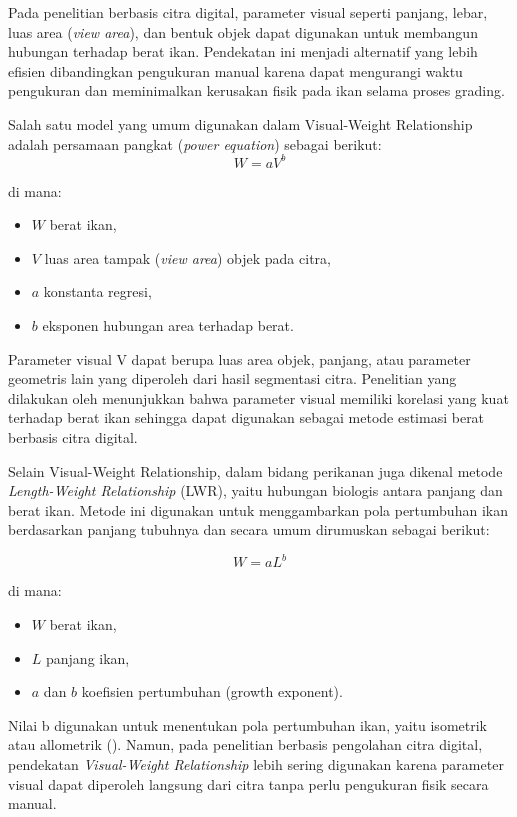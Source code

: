Pada penelitian berbasis citra digital, parameter visual seperti panjang, lebar, luas area (\emph{view area}), dan bentuk objek dapat digunakan untuk membangun hubungan terhadap berat ikan.
Pendekatan ini menjadi alternatif yang lebih efisien dibandingkan pengukuran manual karena dapat mengurangi waktu pengukuran dan meminimalkan kerusakan fisik pada ikan selama proses grading.

Salah satu model yang umum digunakan dalam Visual-Weight Relationship adalah persamaan pangkat (\emph{power equation}) sebagai berikut:
\begin{equation}
W = aV^b
\label{eq:vwr}
\end{equation}

di mana:
\begin{itemize}
    \item $W$ berat ikan,
    \item $V$ luas area tampak (\textit{view area}) objek pada citra,
    \item $a$ konstanta regresi,
    \item $b$ eksponen hubungan area terhadap berat.
\end{itemize}

Parameter visual V dapat berupa luas area objek, panjang, atau parameter geometris lain yang diperoleh dari hasil segmentasi citra.
Penelitian yang dilakukan oleh \textcite{Balaban2010} menunjukkan bahwa parameter visual memiliki korelasi yang kuat terhadap berat ikan sehingga dapat digunakan sebagai metode estimasi berat berbasis citra digital.

Selain Visual-Weight Relationship, dalam bidang perikanan juga dikenal metode \emph{Length-Weight Relationship} (LWR),
yaitu hubungan biologis antara panjang dan berat ikan. Metode ini digunakan untuk menggambarkan pola pertumbuhan ikan berdasarkan panjang tubuhnya dan secara umum dirumuskan sebagai berikut:

\begin{equation}
W = aL^b
\label{eq:lwr}
\end{equation}

di mana:
\begin{itemize}
    \item $W$ berat ikan,
    \item $L$ panjang ikan,
    \item $a$ dan $b$  koefisien pertumbuhan (growth exponent).
\end{itemize}

Nilai b digunakan untuk menentukan pola pertumbuhan ikan, yaitu isometrik atau allometrik (\cite{LeCren1951}).
Namun, pada penelitian berbasis pengolahan citra digital, pendekatan \emph{Visual-Weight Relationship} lebih sering digunakan karena parameter visual dapat diperoleh langsung dari citra tanpa perlu pengukuran fisik secara manual.

